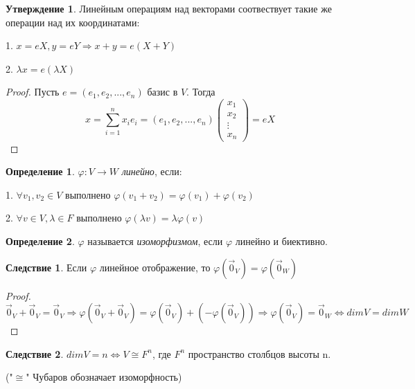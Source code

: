 \documentclass[a4paper, 12pt]{article}
\theoremstyle{definition}
\newtheorem*{definition}{Определение}
\newtheorem*{consequense}{Следствие}
\newtheorem*{subtheorem}{Утверждение}
\begin{document}
    \begin{subtheorem}
        Линейным операциям над векторами соотвествует такие же
        операции над их координатами: 
        
        1. $x = eX, y = eY \Rightarrow x + y = e(X + Y)$

        2. $\lambda x = e(\lambda X)$
    \end{subtheorem}
    \begin{proof}
        Пусть $e = (e_1, e_2,...,e_n)$ базис в $V$.
        Тогда $$x = \sum\limits_{i=1}^n x_i e_i =
        (e_1, e_2,..., e_n)
        \begin{pmatrix}
            x_1\\
            x_2\\
            \vdots\\
            x_n
        \end{pmatrix}
        = eX$$
    \end{proof}
    \begin{definition}
        $\varphi: V \to W$ \textit{линейно}, если:

        1. $\forall v_1, v_2 \in V$ выполнено
        $\varphi (v_1 + v_2) = \varphi (v_1) + \varphi (v_2)$

        2. $\forall v \in V, \lambda \in F$ выполнено
        $\varphi (\lambda v) = \lambda \varphi (v)$
    \end{definition}
    \begin{definition}
        $\varphi$ называется \textit{изоморфизмом}, если
        $\varphi$ линейно и биективно.
    \end{definition}
    \begin{consequense}
        Если $\varphi$ линейное отображение, то $\varphi
        (\vec 0_V) = \varphi (\vec 0_W)$
    \end{consequense}
    \begin{proof}
        $$\vec 0_V + \vec 0_V = \vec 0_V \Rightarrow 
        \varphi (\vec 0_V + \vec 0_V) = \varphi (\vec 0_V) +
        (-\varphi (\vec 0_V)) \Rightarrow 
        \varphi(\vec 0_V) = \vec 0_W \Leftrightarrow
        dimV = dimW$$
    \end{proof}
    \begin{consequense}
        $dimV=n \Leftrightarrow V \cong F^n$, где $F^n$
        пространство столбцов высоты n.
        
        ("$\cong$" Чубаров обозначает изоморфность)
    \end{consequense}
\end{document}
